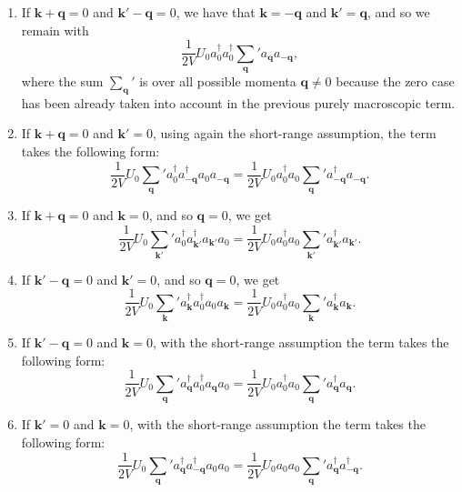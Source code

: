 \begin{enumerate}
    \item If \( \mathbf{k} + \mathbf{q} = 0 \) and \( \mathbf{k}' - \mathbf{q} = 0 \), we have that \( \mathbf{k} = -\mathbf{q} \) and \( \mathbf{k}' = \mathbf{q} \), and so we remain with
          \[
              \frac{1}{2V} U_0 a_0^\dagger a_0^\dagger \sum_{\mathbf{q}}' a_{\mathbf{q}} a_{-\mathbf{q}},
          \]
          where the sum \( \sum_{\mathbf{q}}' \) is over all possible momenta \( \mathbf{q} \neq 0 \) because the zero case has been already taken into account in the previous purely macroscopic term.

    \item If \( \mathbf{k} + \mathbf{q} = 0 \) and \( \mathbf{k}' = 0 \), using again the short-range assumption, the term takes the following form:
          \[
              \frac{1}{2V} U_0 \sum_{\mathbf{q}}' a_0^\dagger a_{-\mathbf{q}}^\dagger a_0 a_{-\mathbf{q}} = \frac{1}{2V} U_0 a_0^\dagger a_0 \sum_{\mathbf{q}}' a_{-\mathbf{q}}^\dagger a_{-\mathbf{q}}.
          \]

    \item If \( \mathbf{k} + \mathbf{q} = 0 \) and \( \mathbf{k} = 0 \), and so \( \mathbf{q} = 0 \), we get
          \[
              \frac{1}{2V} U_0 \sum_{\mathbf{k}'}' a_0^\dagger a_{\mathbf{k}'}^\dagger a_{\mathbf{k}'} a_0 = \frac{1}{2V} U_0 a_0^\dagger a_0 \sum_{\mathbf{k}'}' a_{\mathbf{k}'}^\dagger a_{\mathbf{k}'}.
          \]

    \item If \( \mathbf{k}' - \mathbf{q} = 0 \) and \( \mathbf{k}' = 0 \), and so \( \mathbf{q} = 0 \), we get
          \[
              \frac{1}{2V} U_0 \sum_{\mathbf{k}}' a_{\mathbf{k}}^\dagger a_0^\dagger a_0 a_{\mathbf{k}} = \frac{1}{2V} U_0 a_0^\dagger a_0 \sum_{\mathbf{k}}' a_{\mathbf{k}}^\dagger a_{\mathbf{k}}.
          \]

    \item If \( \mathbf{k}' - \mathbf{q} = 0 \) and \( \mathbf{k} = 0 \), with the short-range assumption the term takes the following form:
          \[
              \frac{1}{2V} U_0 \sum_{\mathbf{q}}' a_{\mathbf{q}}^\dagger a_0^\dagger a_{\mathbf{q}} a_0 = \frac{1}{2V} U_0 a_0^\dagger a_0 \sum_{\mathbf{q}}' a_{\mathbf{q}}^\dagger a_{\mathbf{q}}.
          \]

    \item If \( \mathbf{k}' = 0 \) and \( \mathbf{k} = 0 \), with the short-range assumption the term takes the following form:
          \[
              \frac{1}{2V} U_0 \sum_{\mathbf{q}}' a_{\mathbf{q}}^\dagger a_{-\mathbf{q}}^\dagger a_0 a_0 = \frac{1}{2V} U_0 a_0 a_0 \sum_{\mathbf{q}}' a_{\mathbf{q}}^\dagger a_{-\mathbf{q}}^\dagger.
          \]
\end{enumerate}

